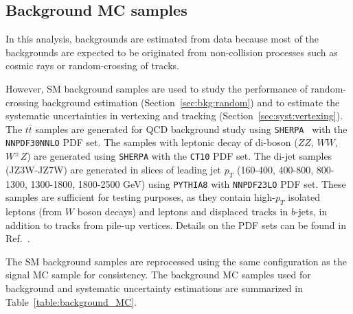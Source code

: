 \subsection{Background MC samples}
\label{sec:background_mc_sample}
In this analysis, backgrounds are estimated from data because most of the backgrounds are expected to be originated from non-collision processes such as cosmic rays or random-crossing of tracks. %

However, SM background samples are used to study the performance of random-crossing background estimation (Section~\ref{sec:bkg:random}) and to estimate the systematic uncertainties in vertexing and tracking (Section~\ref{sec:syst:vertexing}). The $t\bar{t}$ samples are generated for QCD background study using \texttt{SHERPA}~\cite{Gleisberg:2008ta} with the \texttt{NNPDF30NNLO} PDF set. The samples with leptonic decay of di-boson ($ZZ$, $WW$, $W^{\pm}Z$) are generated using \texttt{SHERPA} with the \texttt{CT10} PDF set. The di-jet samples (JZ3W-JZ7W) are generated in slices of leading jet $p_{T}$ (160-400, 400-800, 800-1300, 1300-1800, 1800-2500 GeV) using \texttt{PYTHIA8} with \texttt{NNPDF23LO} PDF set. These samples are sufficient for testing purposes, as they contain high-$p_{T}$ isolated leptons (from $W$ boson decays) and leptons and displaced tracks in $b$-jets, in addition to tracks from pile-up vertices. Details on the PDF sets can be found in Ref.~\cite{Ball:2014uw}.

The SM background samples are reprocessed using the same configuration as the signal MC sample for consistency. The background MC samples used for background and systematic uncertainty estimations are summarized in Table~\ref{table:background_MC}.


